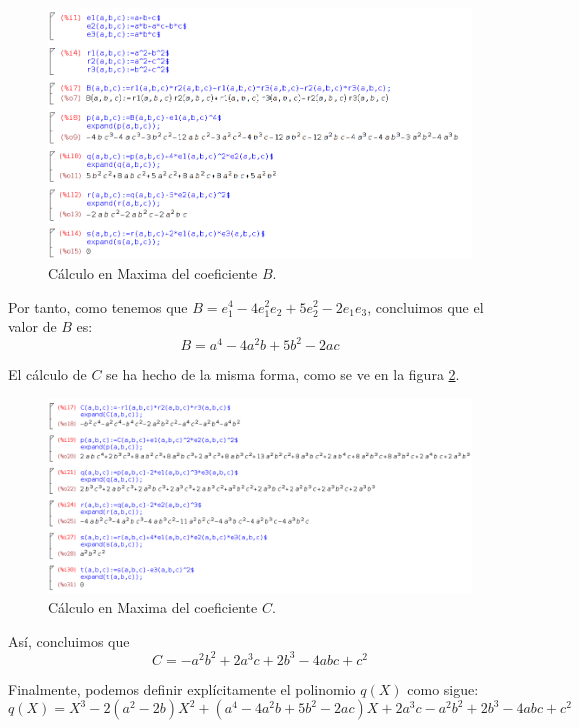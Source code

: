 \documentclass[a4paper, 11pt]{article}
\begin{document}
\begin{solucion}
\begin{apartado}
           \begin{figure}[ht!]
               \centering
               \includegraphics[width=130mm]{IMG/S02-01.png}
               \caption{Cálculo en Maxima del coeficiente $B$. \label{algoritmo}}
           \end{figure}

           Por tanto, como tenemos que $B = e_1^4-4e_1^2e_2+5e_2^2-2e_1e_3$, concluimos que el valor de $B$ es:
           \[
           \boxed{B = a^4 - 4a^2b + 5b^2 - 2ac}
           \]

           El cálculo de $C$ se ha hecho de la misma forma, como se ve en la figura \ref{algoritmo2}.

           \begin{figure}[ht!]
               \centering
               \includegraphics[width=140mm]{IMG/S02-02.png}
               \caption{Cálculo en Maxima del coeficiente $C$. \label{algoritmo2}}
           \end{figure}

           Así, concluimos que
           \[
           \boxed{C = -a^2b^2 + 2a^3c + 2b^3 -4abc +c^2}
           \]

           Finalmente, podemos definir explícitamente el polinomio $q(X)$ como sigue:
           \[
           \boxed{q(X) = X^3 - 2(a^2-2b)X^2 + (a^4 - 4a^2b + 5b^2 - 2ac)X + 2a^3c - a^2b^2 + 2b^3 -4abc +c^2}
           \]
      \end{apartado}
  \end{solucion}
\end{document}
